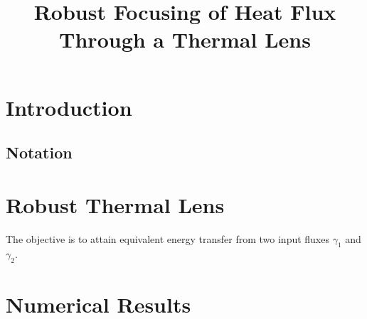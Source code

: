 \documentclass[11pt]{article}
\title{Robust Focusing of Heat Flux\\ Through a Thermal Lens}
\date{}
\begin{document}
\maketitle

\begin{abstract}
    
\end{abstract}

\section{Introduction}

\subsection{Notation}

\section{Robust Thermal Lens}

The objective is to attain equivalent energy transfer from two input fluxes $\gamma_1$ and $\gamma_2$.


\section{Numerical Results}

\newpage


\end{document}
